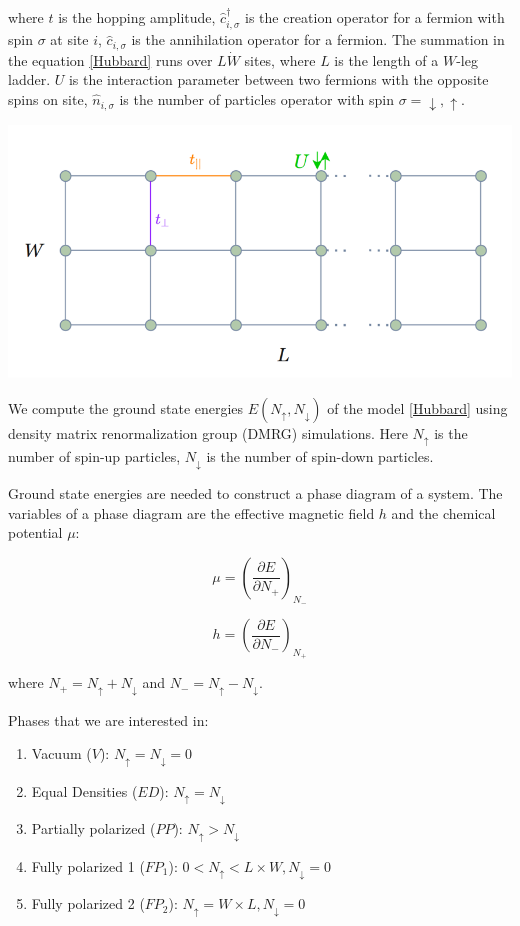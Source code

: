 \documentclass[a0,portrait]{a0poster}
\begin{document}
\begin{multicols}{2}
where $t$ is the hopping amplitude, $\hat{c}_{i,\sigma}^{\dagger}$ is the creation operator for a fermion with spin $\sigma$ at site $i$, $\hat{c}_{i,\sigma}$ is the annihilation operator for a fermion. The summation in the equation \eqref{Hubbard} runs over $L \dot W$ sites, where $L$ is the length of a $W$-leg ladder. $U$ is the interaction parameter between two fermions with the opposite spins on site, $\hat{n}_{i, \sigma}$ is the number of particles operator with spin $\sigma = \downarrow, \uparrow$.

\begin{center}\vspace{0.9cm}
\includegraphics[width=0.5\linewidth]{lattice.png}
\end{center}\vspace{0.9cm}

We compute the ground state energies $E(N_{\uparrow}, N_{\downarrow})$ of the model \eqref{Hubbard} using density matrix renormalization group (DMRG) simulations. Here $N_{\uparrow}$ is the number of spin-up particles, $N_{\downarrow}$ is the number of spin-down particles.

Ground state energies are needed to construct a phase diagram of a system. The variables of a phase diagram are the effective magnetic field $h$ and the chemical potential $\mu$:

\begin{equation} \label{mu}
\mu = {\left( \frac{\partial E}{\partial N_{+}} \right)}_{N_{-}}
\end{equation}
	
\begin{equation} \label{h}
h = {\left( \frac{\partial E}{\partial N_{-}} \right)}_{N_{+}}
\end{equation}
	 
where $N_{+} = N_{\uparrow} + N_{\downarrow}$ and $N_{-} = N_{\uparrow} - N_{\downarrow}$.

Phases that we are interested in:

\begin{enumerate} 
    \item Vacuum ($V$): $N_{\uparrow} = N_{\downarrow} = 0$
    \item Equal Densities ($ED$): $N_{\uparrow} = N_{\downarrow}$
    \item Partially polarized ($PP$): $N_{\uparrow} > N_{\downarrow}$
    \item Fully polarized 1 ($FP_1$): $0 < N_{\uparrow} < L \times W,  N_{\downarrow} = 0$
    \item Fully polarized 2 ($FP_2$): $N_{\uparrow} = W\times L,  N_{\downarrow} = 0$
\end{enumerate}


\end{multicols}
\end{document}
